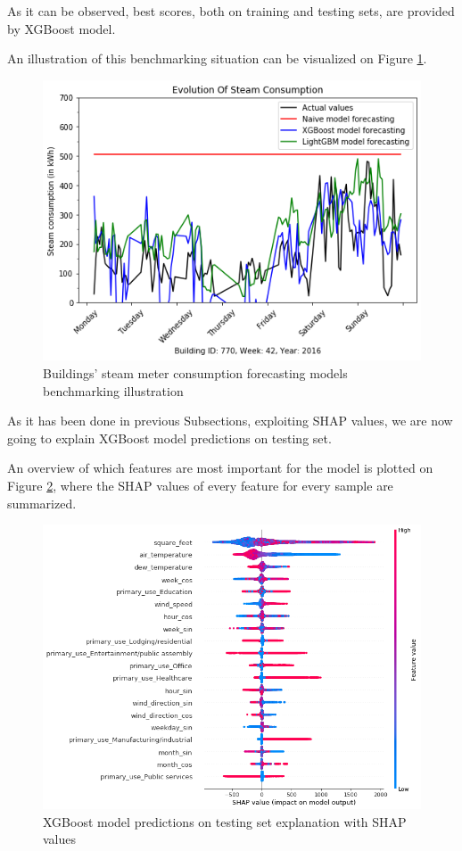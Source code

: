 \documentclass[twocolumn, switch]{article}
\begin{document}
As it can be observed, best scores, both on training and testing sets, are provided by XGBoost model.

An illustration of this benchmarking situation can be visualized on Figure \ref{fig:steam_benchmarking_illustration}.

\begin{figure}[H]
\centering
\includegraphics[scale=0.35]{../graphs/sample_steam_consumption_comparison}
\caption{Buildings' steam meter consumption forecasting models benchmarking illustration}
\label{fig:steam_benchmarking_illustration}
\end{figure}

As it has been done in previous Subsections, exploiting SHAP values, we are now going to explain XGBoost model predictions on testing set.

An overview of which features are most important for the model is plotted on Figure \ref{fig:shap_values_summary_plot_steam}, where the SHAP values of every feature for every sample are summarized.

\begin{figure}[H]
\centering
\includegraphics[scale=0.3]{../graphs/shap_values_summary_plot_steam}
\caption{XGBoost model predictions on testing set explanation with SHAP values}
\label{fig:shap_values_summary_plot_steam}
\end{figure}
\end{document}
